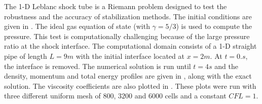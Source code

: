 The 1-D Leblanc shock tube is a Riemann problem designed to test the robustness and the accuracy of stabilization methods. The initial conditions are given in . The ideal gas equation of state (with $\gamma=5/3$) is used to compute the pressure.
This test is computationally challenging because of the large pressure ratio at the shock interface.
The computational domain consists of a 1-D straight pipe of length $L=9m$ with the initial interface located at $x=2m$. At $t=0.s$, the interface is removed. The numerical solution is run until $t=4 s$ and the density, momentum and total energy profiles are given in , along with the exact solution. The viscosity coefficients are also plotted in . These plots were  run with three different uniform mesh of $800$, $3200$ and $6000$ cells and a constant $CFL = 1$.
